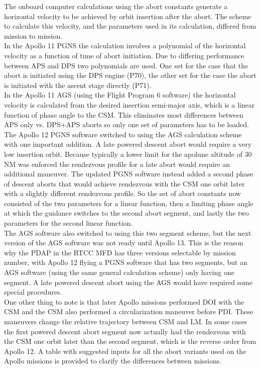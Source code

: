 \documentclass[11pt]{article} %
\begin{document}
The onboard computer calculations using the abort constants generate a horizontal velocity to be achieved by orbit insertion after the abort. The scheme to calculate this velocity, and the parameters used in its calculation, differed from mission to mission.\\

In the Apollo 11 PGNS the calculation involves a polynomial of the horizontal velocity as a function of time of abort initiation. Due to differing performance between APS and DPS two polynomials are used. One set for the case that the abort is initiated using the DPS engine (P70), the other set for the case the abort is initiated with the ascent stage directly (P71).\\

In the Apollo 11 AGS (using the Flight Program 6 software) the horizontal velocity is calculated from the desired insertion semi-major axis, which is a linear function of phase angle to the CSM. This eliminates most differences between APS only vs. DPS+APS aborts so only one set of parameters has to be loaded.\\

The Apollo 12 PGNS software switched to using the AGS calculation scheme with one important addition. A late powered descent abort would require a very low insertion orbit. Because typically a lower limit for the apolune altitude of 30 NM was enforced the rendezvous profile for a late abort would require an additional maneuver. The updated PGNS software instead added a second phase of descent aborts that would achieve rendezvous with the CSM one orbit later with a slightly different rendezvous profile. So the set of abort constants now consisted of the two parameters for a linear function, then a limiting phase angle at which the guidance switches to the second abort segment, and lastly the two parameters for the second linear function.\\

The AGS software also switched to using this two segment scheme, but the next version of the AGS software was not ready until Apollo 13. This is the reason why the PDAP in the RTCC MFD has three versions selectable by mission number, with Apollo 12 flying a PGNS software that has two segments, but an AGS software (using the same general calculation scheme) only having one segment. A late powered descent abort using the AGS would have required some special procedures.\\

One other thing to note is that later Apollo missions performed DOI with the CSM and the CSM also performed a circularization maneuver before PDI. These maneuvers change the relative trajectory between CSM and LM. In some cases the first powered descent abort segment now actually had the rendezvous with the CSM one orbit later than the second segment, which is the reverse order from Apollo 12. A table with suggested inputs for all the abort variants used on the Apollo missions is provided to clarify the differences between missions.\\
\end{document}
